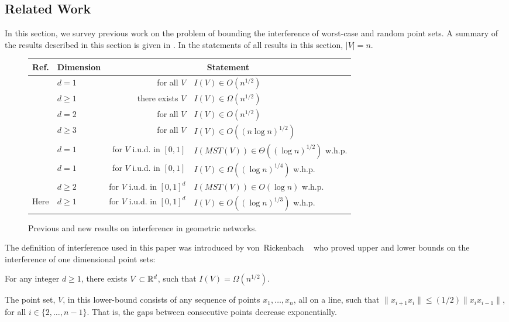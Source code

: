 \documentclass{patmorin}
\newcommand{\mst}{\mathit{MST}}
\begin{document}
\subsection{Related Work}

In this section, we survey previous work on the problem of bounding
the interference of worst-case and random point sets.  A summary of the
results described in this section is given in .  In the statements of all results in this section, $|V|=n$.

\begin{figure}
\begin{center}
  \begin{tabular}{|l|l|r@{, }l|}\hline
    Ref. & Dimension & \multicolumn{2}{c|}{Statement} \\ \hline
    \cite{vR05} & $d=1$ & for all $V$ & $I(V)\in O(n^{1/2})$ \\
    \cite{vR05} & $d\ge 1$ & there exists $V$ & $I(V)\in \Omega(n^{1/2})$ \\
    \cite{ht08} & $d=2$ & for all $V$ & $I(V)\in O(n^{1/2})$ \\
    \cite{ht08} & $d\ge 3$ & for all $V$ & $I(V)\in O((n\log n)^{1/2})$ \\
    \cite{kkmns10} & $d= 1$ & for $V$ i.u.d. in $[0,1]$ & $I(\mst(V))\in \Theta((\log n)^{1/2})$ w.h.p. \\
    \cite{kkmns10,vR05} & $d = 1$ & for $V$ i.u.d. in $[0,1]$  & $I(V)\in\Omega((\log n)^{1/4})$ w.h.p.  \\
    \cite{kdh11} & $d\ge 2$ & for $V$ i.u.d. in $[0,1]^d$ & $I(\mst(V))\in O(\log n)$ w.h.p.  \\
    Here & $d\ge 1$ & for $V$ i.u.d. in $[0,1]^d$  & $I(V)\in O((\log n)^{1/3})$ w.h.p.  \\ \hline
  \end{tabular}
\end{center}
\caption{Previous and new results on interference in geometric networks.}
\end{figure}

The definition of interference used in this paper was introduced by
von~Rickenbach \etal\ \cite{vR05} who proved upper and
lower bounds on the interference of one dimensional point sets:
\begin{thm}
For any integer $d\ge 1$, there exists $V\subset\mathbb{R}^{d}$, such
that $I(V)=\Omega(n^{1/2})$.
\end{thm}
The point set, $V$, in this lower-bound consists of any sequence of
points $x_1,\ldots,x_n$, all on a line, such that $\|x_{i+1}x_i\| \le (1/2)\|x_{i}x_{i-1}\|$,
for all $i\in\{2,\ldots,n-1\}$.  That is, the gaps between consecutive
points decrease exponentially.
\end{document}
